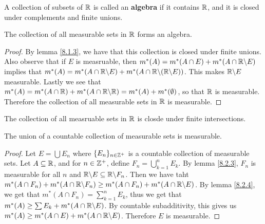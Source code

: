 \begin{definition}
    A collection of subsets of $\mathbb{R}$ is called an  \textbf{algebra} if it
    contains $\mathbb{R}$, and it is closed under complements and finite unions.
\end{definition}

\begin{theorem}\label{8.2.5}
    The collection of all measurable sets in $\mathbb{R}$ forms an algebra.
\end{theorem}
\begin{proof}
    By lemma \ref{8.1.3}, we have that this collection is closed under finite
    unions. Also observe that if $E$ is measruable, then  $m^*(A)=m^*(A \cap
    E)+m^*(A \cap \mathbb{R} \backslash E)$ implies that $m^*(A)=m^*(A \cap
    \mathbb{R} \backslash E)+m^*(A \cap \mathbb{R} \backslash (\mathbb{R} \backslash E))$. This makes $\mathbb{R} \backslash E$
    measurable. Lastly we see that $m^*(A)=m^*(A \cap \mathbb{R})+m^*(A \cap
    \mathbb{R} \backslash \mathbb{R})=m^*(A) + m^*(\emptyset)$, so that $\mathbb{R}$ is measurable.
    Therefore the collection of all measurable sets in  $\mathbb{R}$ is measurable.
\end{proof}
\begin{corollary}
    The collection of all measruable sets in $\mathbb{R}$ is closde under finite
    intersections.
\end{corollary}

\begin{lemma}\label{8.2.6}
    The union of a countable collection of measurable sets is measurable.
\end{lemma}
\begin{proof}
    Let $E=\bigcup{E_n}$ where $\{E_n\}_{n \in \mathbb{Z}^+}$ is a countable collection
    of measurable sets. Let $A \subseteq \mathbb{R}$, and for  $n \in \mathbb{Z}^+$, define
    $F_n=\bigcup_{k=1}^n{E_k}$. By lemma \ref{8.2.3}, $F_n$ is measurable for
    all  $n$ and  $\mathbb{R} \backslash E \subseteq \mathbb{R} \backslash F_n$. Then we have taht
    $m^*(A \cap F_n)+m^*(A \cap \mathbb{R} \backslash F_n) \geq m^*(A \cap F_n)+m^*(A \cap
    \mathbb{R} \backslash E)$. By lemma \ref{8.2.4}, we get that $m^*(A \cap
    F_n)=\sum_{k=1}^n{E_k}$, thus we get that $m^*(A) \geq \sum{E_k}+m^*(A \cap
    \mathbb{R} \backslash E)$. By countable subadditivity, this gives us $m^*(A) \geq m^*(A
    \cap E)+m^*(A \cap \mathbb{R} \backslash E)$. Therefore $E$ is measurable.
\end{proof}

